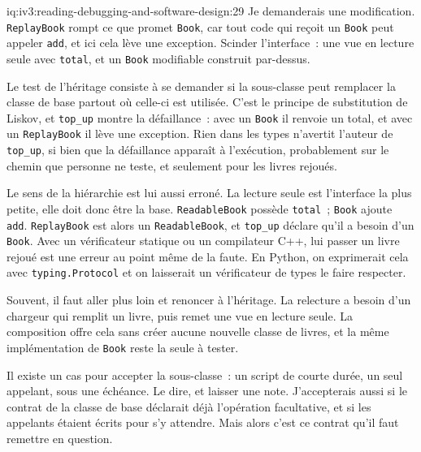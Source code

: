 \begin{solution}{iq:iv3:reading-debugging-and-software-design:29}
Je demanderais une modification. \texttt{ReplayBook} rompt ce que promet \texttt{Book}, car tout code qui reçoit un \texttt{Book} peut appeler \texttt{add}, et ici cela lève une exception. Scinder l'interface~: une vue en lecture seule avec \texttt{total}, et un \texttt{Book} modifiable construit par-dessus.

Le test de l'héritage consiste à se demander si la sous-classe peut remplacer la classe de base partout où celle-ci est utilisée. C'est le principe de substitution de Liskov, et \texttt{top\_up} montre la défaillance~: avec un \texttt{Book} il renvoie un total, et avec un \texttt{ReplayBook} il lève une exception. Rien dans les types n'avertit l'auteur de \texttt{top\_up}, si bien que la défaillance apparaît à l'exécution, probablement sur le chemin que personne ne teste, et seulement pour les livres rejoués.

Le sens de la hiérarchie est lui aussi erroné. La lecture seule est l'interface la plus petite, elle doit donc être la base. \texttt{ReadableBook} possède \texttt{total}~; \texttt{Book} ajoute \texttt{add}. \texttt{ReplayBook} est alors un \texttt{ReadableBook}, et \texttt{top\_up} déclare qu'il a besoin d'un \texttt{Book}. Avec un vérificateur statique ou un compilateur C++, lui passer un livre rejoué est une erreur au point même de la faute. En Python, on exprimerait cela avec \texttt{typing.Protocol} et on laisserait un vérificateur de types le faire respecter.

Souvent, il faut aller plus loin et renoncer à l'héritage. La relecture a besoin d'un chargeur qui remplit un livre, puis remet une vue en lecture seule. La composition offre cela sans créer aucune nouvelle classe de livres, et la même implémentation de \texttt{Book} reste la seule à tester.

Il existe un cas pour accepter la sous-classe~: un script de courte durée, un seul appelant, sous une échéance. Le dire, et laisser une note. J'accepterais aussi si le contrat de la classe de base déclarait déjà l'opération facultative, et si les appelants étaient écrits pour s'y attendre. Mais alors c'est ce contrat qu'il faut remettre en question.


\end{solution}

